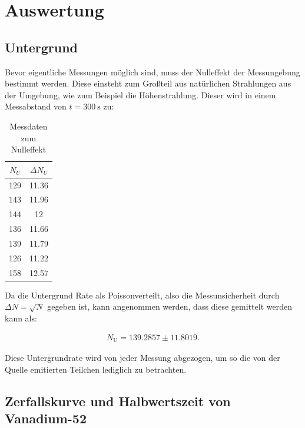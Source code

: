 \newpage
    \section{Auswertung}
    \subsection{Untergrund}
    Bevor eigentliche Messungen möglich sind, muss der Nulleffekt der Messungebung bestimmt werden. Diese einsteht zum Großteil aus natürlichen Strahlungen aus der Umgebung, wie zum Beispiel die Höhenstrahlung.
    Dieser wird in einem Messabstand von $t = \SI{300}{\second}$ zu:
    \begin{table}
	\centering
	\caption{Messdaten zum Nulleffekt}
	\label{tab:untergrundrate}
	\begin{tabular}{c c}
		\toprule
		$N_U$ & $\Delta N_U$ \\
		\midrule
		129 & 11.36 \\
		143 & 11.96 \\
		144 & 12 \\
		136 & 11.66 \\
		139 & 11.79 \\
		126 & 11.22 \\
		158 & 12.57 \\
		\bottomrule
	\end{tabular}
\end{table}
    Da die Untergrund Rate als Poissonverteilt, also die Messunsicherheit durch $\Delta N = \sqrt{N}$  gegeben ist, kann angenommen werden, dass diese gemittelt werden kann als:

    \begin{align*}
    N_\text{U} = 139.2857 \pm 11.8019.
    \end{align*}

    Diese Untergrundrate wird von jeder Messung abgezogen, um so die von der Quelle emitierten Teilchen lediglich zu betrachten.

    \subsection{Zerfallskurve und Halbwertszeit von Vanadium-52}
    \label{sec:vana}

